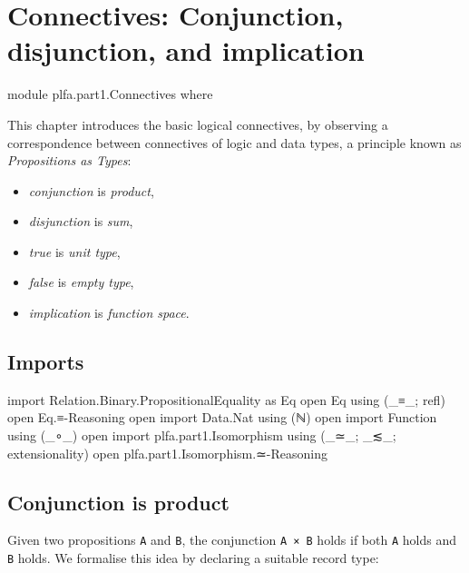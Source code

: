 \hypertarget{Connectives}{%
\chapter{Connectives: Conjunction, disjunction, and
implication}\label{Connectives}}

\begin{fence}
\begin{code}
module plfa.part1.Connectives where
\end{code}
\end{fence}

This chapter introduces the basic logical connectives, by observing a
correspondence between connectives of logic and data types, a principle
known as \emph{Propositions as Types}:

\begin{itemize}
\tightlist
\item
  \emph{conjunction} is \emph{product},
\item
  \emph{disjunction} is \emph{sum},
\item
  \emph{true} is \emph{unit type},
\item
  \emph{false} is \emph{empty type},
\item
  \emph{implication} is \emph{function space}.
\end{itemize}

\hypertarget{imports}{%
\section{Imports}\label{imports}}

\begin{fence}
\begin{code}
import Relation.Binary.PropositionalEquality as Eq
open Eq using (_≡_; refl)
open Eq.≡-Reasoning
open import Data.Nat using (ℕ)
open import Function using (_∘_)
open import plfa.part1.Isomorphism using (_≃_; _≲_; extensionality)
open plfa.part1.Isomorphism.≃-Reasoning
\end{code}
\end{fence}

\hypertarget{conjunction-is-product}{%
\section{Conjunction is product}\label{conjunction-is-product}}

Given two propositions \texttt{A} and \texttt{B}, the conjunction
\texttt{A\ ×\ B} holds if both \texttt{A} holds and \texttt{B} holds. We
formalise this idea by declaring a suitable record type:

